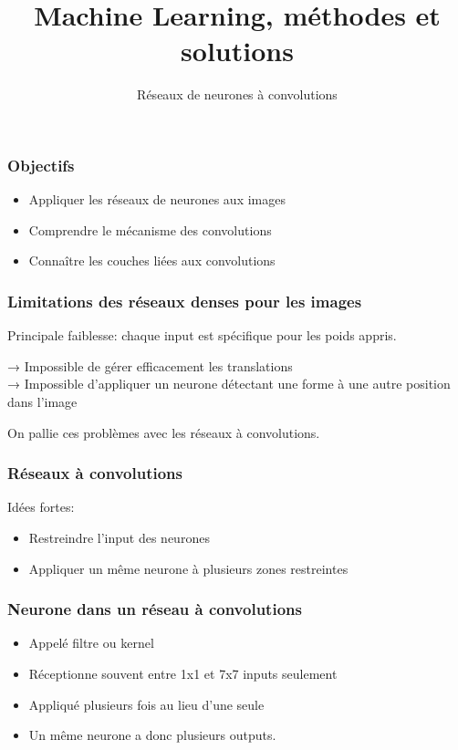\documentclass{formation}
\title{Machine Learning, méthodes et solutions}
\subtitle{Réseaux de neurones à convolutions}
\begin{document}
\maketitle

\begin{frame}
  \frametitle{Objectifs}
  \begin{itemize}
  \item Appliquer les réseaux de neurones aux images
  \item Comprendre le mécanisme des convolutions
  \item Connaître les couches liées aux convolutions
  \end{itemize}
\end{frame}

\begin{frame}
  \frametitle{Limitations des réseaux denses pour les images}
  Principale faiblesse: chaque input est spécifique pour les poids
  appris.

  → Impossible de gérer efficacement les translations\\
  → Impossible
  d'appliquer un neurone détectant une forme à une autre position dans
  l'image

  \alert{On pallie ces problèmes avec les réseaux à convolutions.}
\end{frame}

\begin{frame}
  \frametitle{Réseaux à convolutions}
  Idées fortes:

  \begin{itemize}
  \item Restreindre l'input des neurones
  \item Appliquer un même neurone à plusieurs zones restreintes
  \end{itemize}
\end{frame}

\begin{frame}
  \frametitle{Neurone dans un réseau à convolutions}
  \begin{itemize}
  \item Appelé filtre ou kernel
  \item Réceptionne souvent entre 1x1 et 7x7 inputs seulement
  \item Appliqué plusieurs fois au lieu d'une seule
  \item Un même neurone a donc \alert{plusieurs outputs}.
  \end{itemize}
\end{frame}
\end{document}
